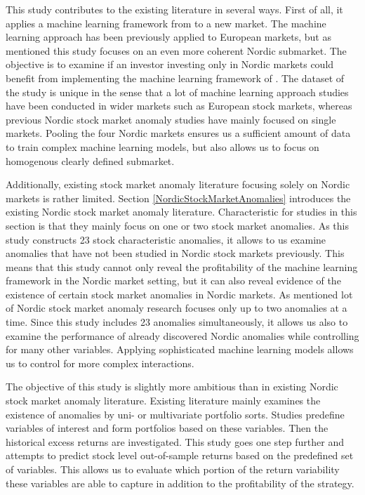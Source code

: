 \documentclass[12pt]{article}
\begin{document}
This study contributes to the existing literature in several ways. First of all, it applies a machine learning framework from \citet{guetal} to a new market. The machine learning approach has been previously applied to European markets, but as mentioned this study focuses on an even more coherent Nordic submarket.\footnotemark {} The objective is to examine if an investor investing only in Nordic markets could benefit from implementing the machine learning framework of \citet{guetal}. The dataset of the study is unique in the sense that a lot of machine learning approach studies have been conducted in wider markets such as European stock markets, whereas previous Nordic stock market anomaly studies have mainly focused on single markets. Pooling the four Nordic markets ensures us a sufficient amount of data to train complex machine learning models, but also allows us to focus on homogenous clearly defined submarket. \par

Additionally, existing stock market anomaly literature focusing solely on Nordic markets is rather limited. Section \ref{NordicStockMarketAnomalies} introduces the existing Nordic stock market anomaly literature. Characteristic for studies in this section is that they mainly focus on one or two stock market anomalies. As this study constructs 23 stock characteristic anomalies, it allows to us examine anomalies that have not been studied in Nordic stock markets previously. This means that this study cannot only reveal the profitability of the machine learning framework in the Nordic market setting, but it can also reveal evidence of the existence of certain stock market anomalies in Nordic markets. As mentioned lot of Nordic stock market anomaly research focuses only up to two anomalies at a time. Since this study includes 23 anomalies simultaneously, it allows us also to examine the performance of already discovered Nordic anomalies while controlling for many other variables. Applying sophisticated machine learning models allows us to control for more complex interactions. \par

The objective of this study is slightly more ambitious than in existing Nordic stock market anomaly literature. Existing literature mainly examines the existence of anomalies by uni- or multivariate portfolio sorts. Studies predefine variables of interest and form portfolios based on these variables. Then the historical excess returns are investigated. This study goes one step further and attempts to predict stock level out-of-sample returns based on the predefined set of variables. This allows us to evaluate which portion of the return variability these variables are able to capture in addition to the profitability of the strategy. \par
\end{document}
